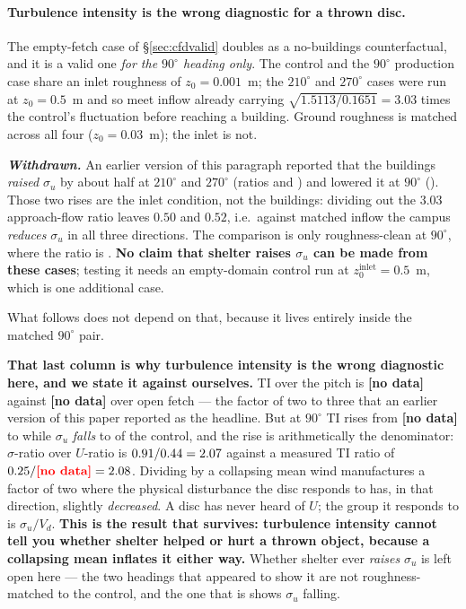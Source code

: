 \documentclass[11pt,letterpaper]{article}
\newcommand{\MISSINGNUM}{\textbf{\color{red}[no data]}}%
\newcommand{\VertTIpitchRange}{\MISSINGNUM}\newcommand{\VertTIcontrol}{\MISSINGNUM}%
\begin{document}
\paragraph{Turbulence intensity is the wrong diagnostic for a thrown disc.}
The empty-fetch case of \S\ref{sec:cfdvalid} doubles as a no-buildings
counterfactual, and it is a valid one \emph{for the $90^\circ$ heading only}. The
control and the $90^\circ$ production case share an inlet roughness of
$z_0 = 0.001$~m; the $210^\circ$ and $270^\circ$ cases were run at $z_0 = 0.5$~m and
so meet inflow already carrying $\sqrt{1.5113/0.1651} = 3.03$ times the control's
fluctuation before reaching a building. Ground roughness is matched across all four
($z_0 = 0.03$~m); the inlet is not.

\emph{\textbf{Withdrawn.}} An earlier version of this paragraph reported that the
buildings \emph{raised} $\sigma_u$ by about half at $210^\circ$ and $270^\circ$
(ratios \VertSigRatioHTwoOneZero{} and \VertSigRatioHTwoSevenZero{}) and lowered it
at $90^\circ$ (\VertSigRatioHNineZero). Those two rises are the inlet condition, not
the buildings: dividing out the $3.03$ approach-flow ratio leaves $0.50$ and $0.52$,
i.e.\ against matched inflow the campus \emph{reduces} $\sigma_u$ in all three
directions. The comparison is only roughness-clean at $90^\circ$, where the ratio is
\VertSigRatioHNineZero{}. \textbf{No claim that shelter raises $\sigma_u$ can be made
from these cases}; testing it needs an empty-domain control run at
$z_0^{\text{inlet}} = 0.5$~m, which is one additional case.

What follows does not depend on that, because it lives entirely inside the matched
$90^\circ$ pair.

\textbf{That last column is why turbulence intensity is the wrong diagnostic here, and we
state it against ourselves.} TI over the pitch is \VertTIpitchRange{} against
\VertTIcontrol{} over open fetch --- the factor of two to three that an earlier version of
this paper reported as the headline. But at $90^\circ$ TI rises from \VertTIcontrol{} to
\VertTIpitchHNineZero{} while $\sigma_u$ \emph{falls} to \VertSigRatioHNineZero{} of the
control, and the rise is arithmetically the denominator: $\sigma$-ratio over $U$-ratio is
$0.91/0.44 = 2.07$ against a measured TI ratio of
$\VertTIpitchHNineZero/\VertTIcontrol = 2.08$. Dividing by a collapsing mean wind
manufactures a factor of two where the physical disturbance the disc responds to has, in
that direction, slightly \emph{decreased}. A disc has never heard of $U$; the group it
responds to is $\sigma_u/V_d$. \textbf{This is the result that survives: turbulence
intensity cannot tell you whether shelter helped or hurt a thrown object, because a
collapsing mean inflates it either way.} Whether shelter ever \emph{raises} $\sigma_u$ is
left open here --- the two headings that appeared to show it are not roughness-matched to
the control, and the one that is shows $\sigma_u$ falling.
\end{document}
